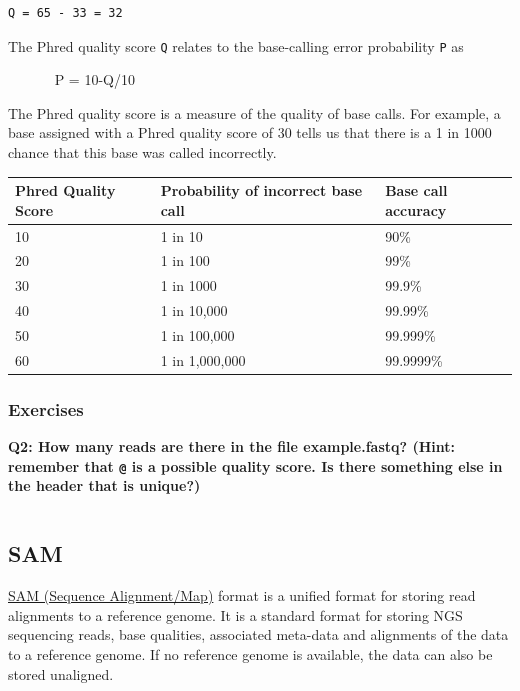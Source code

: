 \documentclass[11pt]{article}
\makeatletter
\newcommand{\boxspacing}{\kern\kvtcb@left@rule\kern\kvtcb@boxsep}
\newcommand{\prompt}[4]{
        {\ttfamily\llap{{\color{blue}\LARGE\faKeyboardO\hspace{3pt}#4}}\vspace{-\baselineskip}}
    }
\makeatother
\begin{document}
\begin{verbatim}
Q = 65 - 33 = 32
\end{verbatim}

The Phred quality score \texttt{Q} relates to the base-calling error
probability \texttt{P} as

~~~~~~ P = 10-Q/10

The Phred quality score is a measure of the quality of base calls. For
example, a base assigned with a Phred quality score of 30 tells us that
there is a 1 in 1000 chance that this base was called incorrectly.

\begin{longtable}[]{@{}lll@{}}
\hline
Phred Quality Score & Probability of incorrect base call & Base call
accuracy\tabularnewline
\hline
\endhead
10 & 1 in 10 & 90\%\tabularnewline
20 & 1 in 100 & 99\%\tabularnewline
30 & 1 in 1000 & 99.9\%\tabularnewline
40 & 1 in 10,000 & 99.99\%\tabularnewline
50 & 1 in 100,000 & 99.999\%\tabularnewline
60 & 1 in 1,000,000 & 99.9999\%\tabularnewline
\hline
\end{longtable}

    \hypertarget{exercises}{%
\subsubsection{Exercises}\label{exercises}}

\textbf{Q2: How many reads are there in the file example.fastq? (Hint:
remember that \texttt{@} is a possible quality score. Is there something
else in the header that is unique?)}

    \begin{tcolorbox}[breakable, size=fbox, boxrule=1pt, pad at break*=1mm,colback=cellbackground, colframe=cellborder]
\prompt{In}{incolor}{ }{\boxspacing}
\begin{Verbatim}[commandchars=\\\{\}]

\end{Verbatim}
\end{tcolorbox}

    \hypertarget{sam}{%
\subsection{SAM}\label{sam}}

\href{https://samtools.github.io/hts-specs/SAMv1.pdf}{SAM (Sequence
Alignment/Map)} format is a unified format for storing read alignments
to a reference genome. It is a standard format for storing NGS
sequencing reads, base qualities, associated meta-data and alignments of
the data to a reference genome. If no reference genome is available, the
data can also be stored unaligned.
\end{document}
